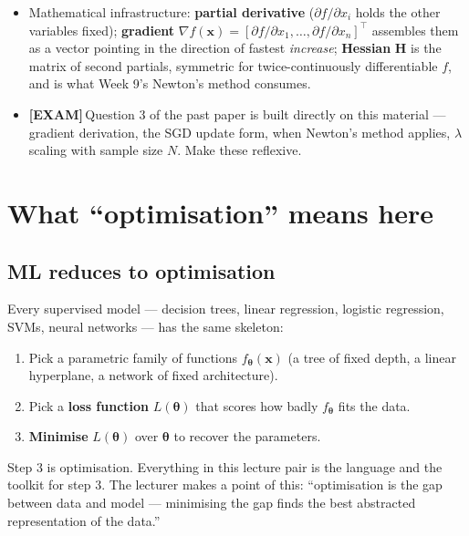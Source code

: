 \documentclass[11pt, a4paper]{article}
\newcommand{\examflag}{\textcolor{tipBd}{\textbf{[EXAM]}}\,}
\begin{document}
\begin{tldrbox}
\begin{itemize}[leftmargin=*]
  \item Mathematical infrastructure: \textbf{partial derivative} ($\partial f/\partial x_i$ holds the other variables fixed); \textbf{gradient} $\nabla f(\mathbf{x}) = [\partial f/\partial x_1, \ldots, \partial f/\partial x_n]^\top$ assembles them as a vector pointing in the direction of fastest \emph{increase}; \textbf{Hessian} $\mathbf{H}$ is the matrix of second partials, symmetric for twice-continuously differentiable $f$, and is what Week 9's Newton's method consumes.
  \item \examflag{}Question 3 of the past paper is built directly on this material — gradient derivation, the SGD update form, when Newton's method applies, $\lambda$ scaling with sample size $N$. Make these reflexive.
\end{itemize}
\end{tldrbox}

\section{What ``optimisation'' means here}

\subsection{ML reduces to optimisation}

Every supervised model — decision trees, linear regression, logistic regression, SVMs, neural networks — has the same skeleton:

\begin{enumerate}
  \item Pick a parametric family of functions $f_{\boldsymbol\theta}(\mathbf{x})$ (a tree of fixed depth, a linear hyperplane, a network of fixed architecture).
  \item Pick a \textbf{loss function} $L(\boldsymbol\theta)$ that scores how badly $f_{\boldsymbol\theta}$ fits the data.
  \item \textbf{Minimise} $L(\boldsymbol\theta)$ over $\boldsymbol\theta$ to recover the parameters.
\end{enumerate}

Step 3 is optimisation. Everything in this lecture pair is the language and the toolkit for step 3. The lecturer makes a point of this: ``optimisation is the gap between data and model — minimising the gap finds the best abstracted representation of the data.''
\end{document}
